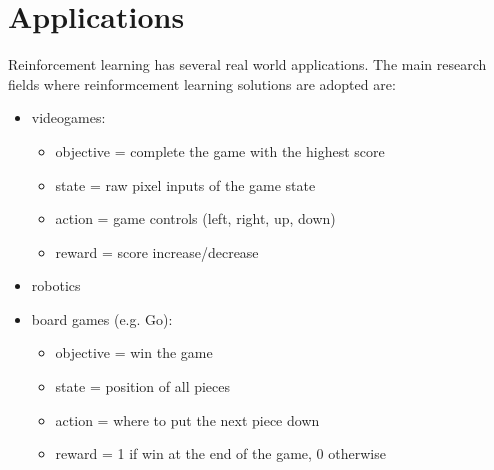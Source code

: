 \section{Applications}
Reinforcement learning has several real world applications. The main research fields where reinformcement learning solutions are adopted are:

\begin{itemize}
    \item videogames:
    \begin{itemize}
        \item objective = complete the game with the highest score
        \item state = raw pixel inputs of the game state
        \item action = game controls (left, right, up, down)
        \item reward = score increase/decrease
    \end{itemize}
    \item robotics
    \item board games (e.g. Go):
    \begin{itemize}
        \item objective = win the game
        \item state = position of all pieces
        \item action = where to put the next piece down
        \item reward = 1 if win at the end of the game, 0 otherwise
    \end{itemize}
\end{itemize}

